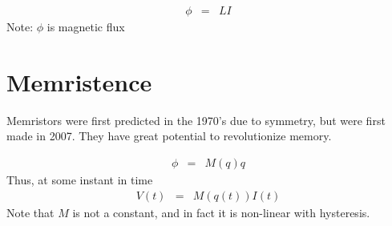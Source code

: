 \begin{eqnarray}
\phi &=& LI
\end{eqnarray}
Note: $\phi$ is magnetic flux

\section{Memristence}

Memristors were first predicted in the 1970's due to symmetry, but were first made in 2007.  They have great potential to revolutionize memory.

\begin{eqnarray}
\phi &=& M(q)q
\end{eqnarray}
Thus, at some instant in time
\begin{eqnarray}
V(t) &=& M(q(t))I(t)
\end{eqnarray}
Note that $M$ is not a constant, and in fact it is non-linear with hysteresis.



